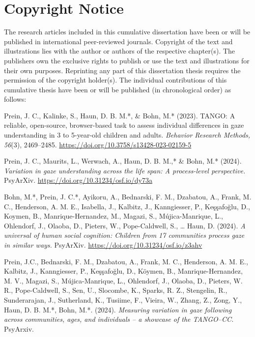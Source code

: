 \documentclass[
]{scrbook}
\begin{document}
\begin{titlepage}
\end{titlepage}

\tableofcontents

\chapter{Copyright Notice}\label{copyright}

The research articles included in this cumulative dissertation have been or will be published in international peer-reviewed journals. Copyright of the text and illustrations lies with the author or authors of the respective chapter(s). The publishers own the exclusive rights to publish or use the text and illustrations for their own purposes. Reprinting any part of this dissertation thesis requires the permission of the copyright holder(s).
The individual contributions of this cumulative thesis have been or will be published (in chronological order) as follows:

Prein, J. C., Kalinke, S., Haun, D. B. M.*, \& Bohn, M.* (2023). TANGO: A reliable, open-source, browser-based task to assess individual differences in gaze understanding in 3 to 5-year-old children and adults. \emph{Behavior Research Methods, 56}(3), 2469--2485. \url{https://doi.org/10.3758/s13428-023-02159-5}

Prein, J. C., Maurits, L., Werwach, A., Haun, D. B. M.,* \& Bohn, M.* (2024). \emph{Variation in gaze understanding across the life span: A process-level perspective.} PsyArXiv. \url{https://doi.org/10.31234/osf.io/dy73a}

Bohn, M.*, Prein, J. C.*, Ayikoru, A., Bednarski, F. M., Dzabatou, A., Frank, M. C., Henderson, A. M. E., Isabella, J., Kalbitz, J., Kanngiesser, P., Keşşafoğlu, D., Koymen, B., Manrique-Hernandez, M., Magazi, S., Mújica-Manrique, L., Ohlendorf, J., Olaoba, D., Pieters, W., Pope-Caldwell, S., \ldots{} Haun, D. (2024). \emph{A universal of human social cognition: Children from 17 communities process gaze in similar ways.} PsyArXiv. \url{https://doi.org/10.31234/osf.io/z3ahv}

Prein, J.C., Bednarski, F. M., Dzabatou, A., Frank, M. C., Henderson, A. M. E., Kalbitz, J., Kanngiesser, P., Keşşafoğlu, D., Köymen, B., Manrique-Hernandez, M. V., Magazi, S., Mújica-Manrique, L., Ohlendorf, J., Olaoba, D., Pieters, W. R., Pope-Caldwell, S., Sen, U., Slocombe, K., Sparks, R. Z., Stengelin, R., Sunderarajan, J., Sutherland, K., Tusiime, F., Vieira, W., Zhang, Z., Zong, Y., Haun, D. B. M.*, Bohn, M.*. (2024). \emph{Measuring variation in gaze following across communities, ages, and individuals -- a showcase of the TANGO--CC.} PsyArxiv.
\end{document}
